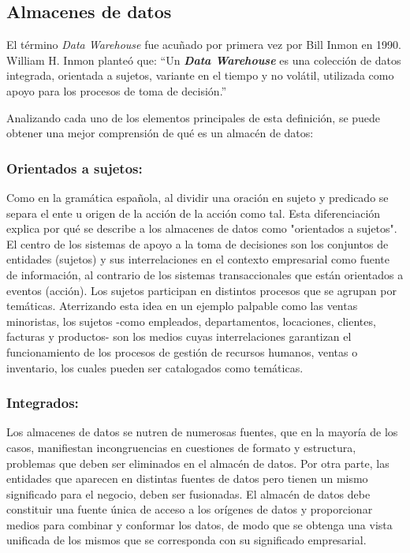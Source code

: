 \subsection{Almacenes de datos}

El término \emph{Data Warehouse} fue acuñado por primera vez por Bill Inmon en 1990. William H. Inmon planteó que: 
“Un \textbf{\emph{Data Warehouse}} es una colección de datos integrada, orientada a sujetos, variante en el tiempo y 
no volátil, utilizada como apoyo para los procesos de toma de decisión.”

Analizando cada uno de los elementos principales de esta definición, se puede obtener una mejor comprensión de qué es un 
almacén de datos:

\subsubsection{Orientados a sujetos:}
%
Como en la gramática española, al dividir una oración en sujeto y predicado se separa el ente u origen de la acci\'on 
de la acci\'on como tal. Esta diferenciación explica por qué se describe a los almacenes de datos como "orientados a sujetos". 
El centro de los sistemas de apoyo a la toma de decisiones son los conjuntos de entidades (sujetos) y sus interrelaciones 
en el contexto empresarial como fuente de información, al contrario de los sistemas transaccionales que est\'an orientados a eventos 
(acci\'on). Los sujetos participan en distintos procesos que se agrupan por 
tem\'aticas. Aterrizando esta idea en un ejemplo palpable como las ventas minoristas, los sujetos -como empleados, departamentos, 
locaciones, clientes, facturas y productos- son los medios cuyas interrelaciones garantizan el funcionamiento de los procesos de 
gestión de recursos humanos, ventas o inventario, los cuales pueden ser catalogados como tem\'aticas. 

\subsubsection{Integrados:}
Los almacenes de datos se nutren de numerosas fuentes, que en la mayor\'ia de los casos, manifiestan 
incongruencias en cuestiones de formato y estructura, problemas que deben ser eliminados en el almac\'en de datos.
Por otra parte, las entidades que aparecen en distintas fuentes de datos pero tienen un mismo significado para el 
negocio, deben ser fusionadas. El almac\'en de datos debe constituir una fuente \'unica de acceso a los or\'igenes de datos 
y proporcionar medios para combinar y conformar los datos, de modo que se obtenga una vista unificada de los mismos que se 
corresponda con su significado empresarial.

